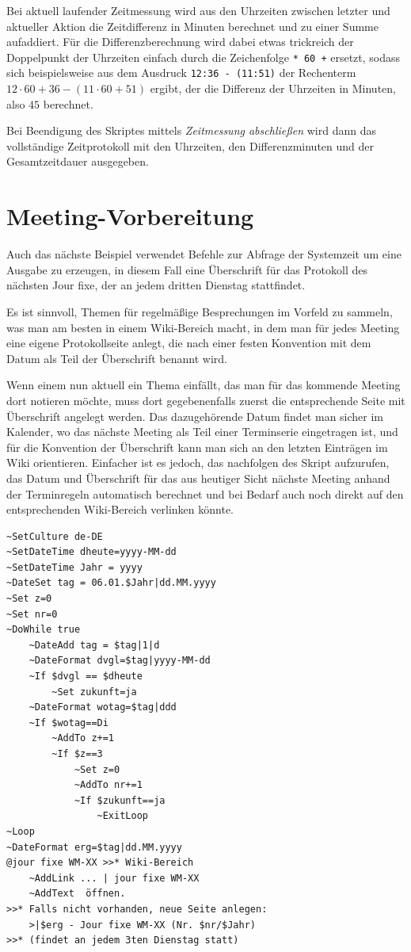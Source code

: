 Bei aktuell laufender Zeitmessung wird aus den Uhrzeiten zwischen letzter und aktueller Aktion die Zeitdifferenz in Minuten berechnet und zu einer Summe aufaddiert. Für die Differenzberechnung wird dabei etwas trickreich der Doppelpunkt der Uhrzeiten einfach durch die Zeichenfolge \verb|* 60 +| ersetzt, sodass sich beispielsweise aus dem Ausdruck \verb|12:36 - (11:51)| der Rechenterm $12\cdot 60+36 -(11\cdot 60+51)$ ergibt, der die Differenz der Uhrzeiten in Minuten, also $45$ berechnet.

Bei Beendigung des Skriptes mittels \emph{Zeitmessung abschließen} wird dann das vollständige Zeitprotokoll mit den Uhrzeiten, den Differenzminuten und der Gesamtzeitdauer ausgegeben.

\section{Meeting-Vorbereitung}\label{MeetingVorbereitung}
Auch das nächste Beispiel verwendet Befehle zur Abfrage der Systemzeit um eine Ausgabe zu erzeugen, in diesem Fall eine Überschrift für das Protokoll des nächsten Jour fixe, der an jedem dritten Dienstag stattfindet.

Es ist sinnvoll, Themen für regelmäßige Besprechungen im Vorfeld zu sammeln, was man am besten in einem Wiki-Bereich macht, in dem man für jedes Meeting eine eigene Protokollseite anlegt, die nach einer festen Konvention mit dem Datum als Teil der Überschrift benannt wird.

Wenn einem nun aktuell ein Thema einfällt, das man für das kommende Meeting dort notieren möchte, muss dort gegebenenfalls zuerst die entsprechende Seite mit Überschrift angelegt werden. Das dazugehörende Datum findet man sicher im Kalender, wo das nächste Meeting als Teil einer Terminserie eingetragen ist, und für die Konvention der Überschrift kann man sich an den letzten Einträgen im Wiki orientieren. Einfacher ist es jedoch, das nachfolgen des Skript aufzurufen, das Datum und Überschrift für das aus heutiger Sicht nächste Meeting anhand der Terminregeln automatisch berechnet und bei Bedarf auch noch direkt auf den entsprechenden Wiki-Bereich verlinken könnte.

\label{BspJourFixePlaner}
\begin{verbatim}
~SetCulture de-DE
~SetDateTime dheute=yyyy-MM-dd
~SetDateTime Jahr = yyyy
~DateSet tag = 06.01.$Jahr|dd.MM.yyyy
~Set z=0
~Set nr=0
~DoWhile true
    ~DateAdd tag = $tag|1|d    
    ~DateFormat dvgl=$tag|yyyy-MM-dd
    ~If $dvgl == $dheute
        ~Set zukunft=ja
    ~DateFormat wotag=$tag|ddd
    ~If $wotag==Di
        ~AddTo z+=1
        ~If $z==3
            ~Set z=0
            ~AddTo nr+=1
            ~If $zukunft==ja
                ~ExitLoop
~Loop
~DateFormat erg=$tag|dd.MM.yyyy
@jour fixe WM-XX >>* Wiki-Bereich
    ~AddLink ... | jour fixe WM-XX
    ~AddText  öffnen.
>>* Falls nicht vorhanden, neue Seite anlegen:
    >|$erg - Jour fixe WM-XX (Nr. $nr/$Jahr)
>>* (findet an jedem 3ten Dienstag statt)
\end{verbatim}

